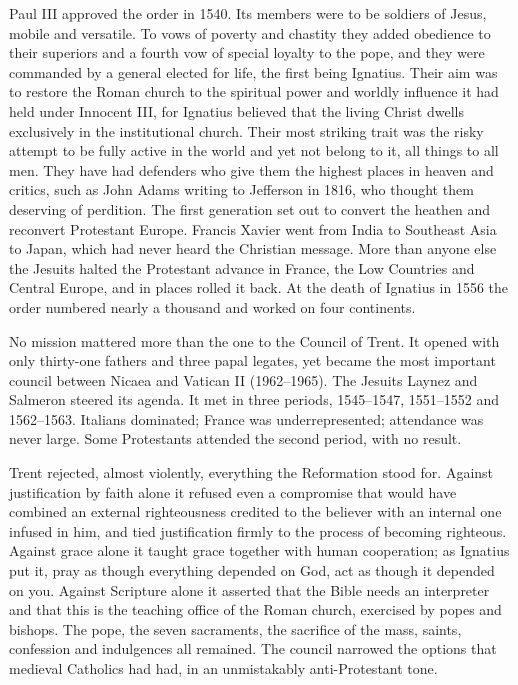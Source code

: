 Paul III approved the order in 1540. Its members were to be soldiers of Jesus, mobile and versatile.
To vows of poverty and chastity they added obedience to their superiors and a fourth vow of special
loyalty to the pope, and they were commanded by a general elected for life, the first being Ignatius.
Their aim was to restore the Roman church to the spiritual power and worldly influence it had held
under Innocent III, for Ignatius believed that the living Christ dwells exclusively in the
institutional church. Their most striking trait was the risky attempt to be fully active in the world and yet not belong to it, all things to all men. They have had defenders who give them the highest
places in heaven and critics, such as John Adams writing to Jefferson in 1816, who thought them
deserving of perdition. The first generation set out to convert the heathen and reconvert Protestant
Europe. Francis Xavier went from India to Southeast Asia to Japan, which had never heard the
Christian message. More than anyone else the Jesuits halted the Protestant advance in France, the Low Countries and Central Europe, and in places rolled it back. At the death of Ignatius in 1556 the order numbered nearly a
thousand and worked on four continents.

No mission mattered more than the one to the Council of Trent. It opened with only thirty-one
fathers and three papal legates, yet became the most important council between Nicaea and Vatican II
(1962--1965). The Jesuits Laynez and Salmeron steered its agenda. It met in three periods, 1545--1547,
1551--1552 and 1562--1563. Italians dominated; France was underrepresented; attendance was never
large. Some Protestants attended the second period, with no result.

Trent rejected, almost violently, everything the Reformation stood for. Against justification by
faith alone it refused even a compromise that would have combined an external righteousness credited
to the believer with an internal one infused in him, and tied justification firmly to the process of
becoming righteous. Against grace alone it taught grace together with human cooperation; as Ignatius
put it, pray as though everything depended on God, act as though it depended on you. Against
Scripture alone it asserted that the Bible needs an interpreter and that this is the teaching office of the Roman church, exercised by popes and bishops. The pope, the seven sacraments, the sacrifice of the mass,
saints, confession and indulgences all remained. The council narrowed the options that medieval
Catholics had had, in an unmistakably anti-Protestant tone.

